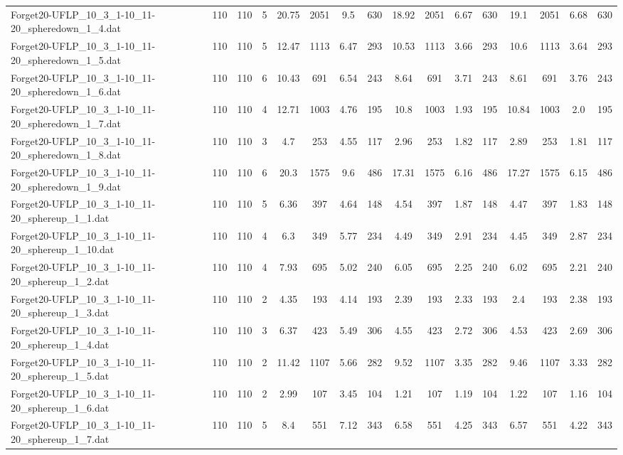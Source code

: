 \begin{sidewaystable}[!ht]
{\begin{tabular}{lccccccccccccccc}
Forget20-UFLP\_10\_3\_1-10\_11-20\_spheredown\_1\_4.dat & 110 & 110 & 5 & 20.75 & 2051 & 9.5 & 630 & 18.92 & 2051 &  \textcolor{blue2}{6.67} & 630 & 19.1 & 2051 & 6.68 & 630 \\
Forget20-UFLP\_10\_3\_1-10\_11-20\_spheredown\_1\_5.dat & 110 & 110 & 5 & 12.47 & 1113 & 6.47 & 293 & 10.53 & 1113 & 3.66 & 293 & 10.6 & 1113 &  \textcolor{blue2}{3.64} & 293 \\
Forget20-UFLP\_10\_3\_1-10\_11-20\_spheredown\_1\_6.dat & 110 & 110 & 6 & 10.43 & 691 & 6.54 & 243 & 8.64 & 691 &  \textcolor{blue2}{3.71} & 243 & 8.61 & 691 & 3.76 & 243 \\
Forget20-UFLP\_10\_3\_1-10\_11-20\_spheredown\_1\_7.dat & 110 & 110 & 4 & 12.71 & 1003 & 4.76 & 195 & 10.8 & 1003 & 1.93 & 195 & 10.84 & 1003 & 2.0 & 195 \\
Forget20-UFLP\_10\_3\_1-10\_11-20\_spheredown\_1\_8.dat & 110 & 110 & 3 & 4.7 & 253 & 4.55 & 117 & 2.96 & 253 & 1.82 & 117 & 2.89 & 253 & 1.81 & 117 \\
Forget20-UFLP\_10\_3\_1-10\_11-20\_spheredown\_1\_9.dat & 110 & 110 & 6 & 20.3 & 1575 & 9.6 & 486 & 17.31 & 1575 & 6.16 & 486 & 17.27 & 1575 &  \textcolor{blue2}{6.15} & 486 \\
Forget20-UFLP\_10\_3\_1-10\_11-20\_sphereup\_1\_1.dat & 110 & 110 & 5 & 6.36 & 397 & 4.64 & 148 & 4.54 & 397 & 1.87 & 148 & 4.47 & 397 & 1.83 & 148 \\
Forget20-UFLP\_10\_3\_1-10\_11-20\_sphereup\_1\_10.dat & 110 & 110 & 4 & 6.3 & 349 & 5.77 & 234 & 4.49 & 349 & 2.91 & 234 & 4.45 & 349 & 2.87 & 234 \\
Forget20-UFLP\_10\_3\_1-10\_11-20\_sphereup\_1\_2.dat & 110 & 110 & 4 & 7.93 & 695 & 5.02 & 240 & 6.05 & 695 & 2.25 & 240 & 6.02 & 695 & 2.21 & 240 \\
Forget20-UFLP\_10\_3\_1-10\_11-20\_sphereup\_1\_3.dat & 110 & 110 & 2 & 4.35 & 193 & 4.14 & 193 & 2.39 & 193 & 2.33 & 193 & 2.4 & 193 & 2.38 & 193 \\
Forget20-UFLP\_10\_3\_1-10\_11-20\_sphereup\_1\_4.dat & 110 & 110 & 3 & 6.37 & 423 & 5.49 & 306 & 4.55 & 423 & 2.72 & 306 & 4.53 & 423 & 2.69 & 306 \\
Forget20-UFLP\_10\_3\_1-10\_11-20\_sphereup\_1\_5.dat & 110 & 110 & 2 & 11.42 & 1107 & 5.66 & 282 & 9.52 & 1107 & 3.35 & 282 & 9.46 & 1107 & 3.33 & 282 \\
Forget20-UFLP\_10\_3\_1-10\_11-20\_sphereup\_1\_6.dat & 110 & 110 & 2 & 2.99 & 107 & 3.45 & 104 & 1.21 & 107 & 1.19 & 104 & 1.22 & 107 & 1.16 & 104 \\
Forget20-UFLP\_10\_3\_1-10\_11-20\_sphereup\_1\_7.dat & 110 & 110 & 5 & 8.4 & 551 & 7.12 & 343 & 6.58 & 551 & 4.25 & 343 & 6.57 & 551 &  \textcolor{blue2}{4.22} & 343 \\

\end{tabular}}
\end{sidewaystable}
